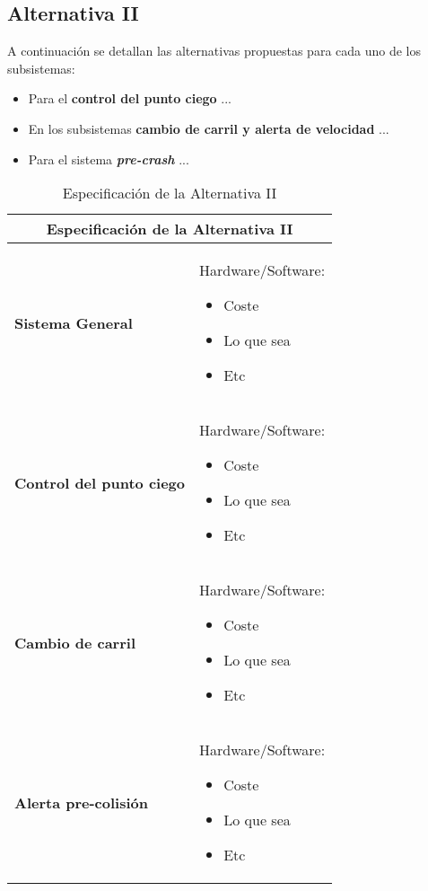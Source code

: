 \subsection{Alternativa II}

\par A continuación se detallan las alternativas propuestas para cada uno de los subsistemas:

\begin{itemize}[-]
    \item Para el \textbf{control del punto ciego} ...
    \item En los subsistemas \textbf{cambio de carril y alerta de velocidad} ...
    \item Para el sistema \textbf{\textit{pre-crash}} ...
\end{itemize}


\begin{table}[H]
\begin{center}
\begin{tabular}{p{5cm} p{8cm}}
\multicolumn{2}{c}{\textbf{Especificación de la Alternativa II} } \\
\hline \hline

\textbf{Sistema General} &
Hardware/Software:
\begin{itemize}
    \item Coste
    \item Lo que sea
    \item Etc
\end{itemize}
\\ \hline

\textbf{Control del punto ciego} &
Hardware/Software:
\begin{itemize}
    \item Coste
    \item Lo que sea
    \item Etc
\end{itemize}
\\ \hline

\textbf{Cambio de carril} &
Hardware/Software:
\begin{itemize}
    \item Coste
    \item Lo que sea
    \item Etc
\end{itemize}
\\ \hline

\textbf{Alerta pre-colisión} &
Hardware/Software:
\begin{itemize}
    \item Coste
    \item Lo que sea
    \item Etc
\end{itemize}
\\ \hline

\end{tabular}
\caption{Especificación de la Alternativa II}
\label{tab:altII}
\end{center}
\end{table}

